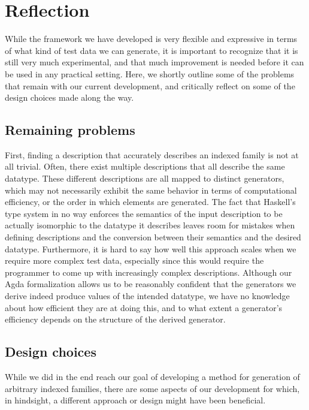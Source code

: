 \documentclass[a4paper,msc,twosized=semi]{uustthesis}
\begin{document}
  

\section{Reflection}

  While the framework we have developed is very flexible and expressive in terms of what 
  kind of test data we can generate, it is important to recognize that it is still very 
  much experimental, and that much improvement is needed before it can be used in any 
  practical setting. Here, we shortly outline some of the problems that remain with 
  our current development, and critically reflect on some of the design choices 
  made along the way. 

\subsection{Remaining problems}

  First, finding a description that accurately describes an indexed family is not at all trivial. Often, there exist 
  multiple descriptions that all describe the same datatype. These different 
  descriptions are all mapped to distinct generators, which may not necessarily 
  exhibit the same behavior in terms of computational efficiency, or the order in 
  which elements are generated. The fact that Haskell's type system in no way enforces 
  the semantics of the input description to be actually isomorphic to the datatype it 
  describes leaves room for mistakes when defining descriptions and the conversion 
  between their semantics and the desired datatype. Furthermore, it is hard to say how 
  well this approach scales when we require more complex test data, especially since 
  this would require the programmer to come up with increasingly complex descriptions. 
  Although our Agda formalization allows us to be reasonably confident that the 
  generators we derive indeed produce values of the intended datatype, we have no 
  knowledge about how efficient they are at doing this, and to what extent a 
  generator's efficiency depends on the structure of the derived generator. 

\subsection{Design choices}

  While we did in the end reach our goal of developing a method for generation of 
  arbitrary indexed families, there are some aspects of our development for which, 
  in hindsight, a different approach or design might have been beneficial. 
\end{document}
